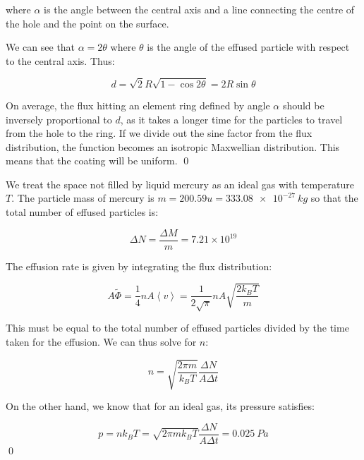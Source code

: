 \documentclass[12pt]{article}
\begin{document}
where $\alpha$ is the angle between the central axis and a line connecting the centre of the hole and the point on the surface.

We can see that $\alpha = 2\theta$ where $\theta$ is the angle of the effused particle with respect to the central axis. Thus:

\begin{equation}
    d = \sqrt{2}R \sqrt{1 - \cos{2\theta}} = 2R \sin{\theta}
\end{equation}

On average, the flux hitting an element ring defined by angle $\alpha$ should be inversely proportional to $d$, as it takes a longer time for the particles to travel from the hole to the ring. If we divide out the sine factor from the flux distribution, the function becomes an isotropic Maxwellian distribution. This means that the coating will be uniform.
\qed


We treat the space not filled by liquid mercury as an ideal gas with temperature $T$. The particle mass of mercury is $m = 200.59u = \qty{333.08e-27}{kg}$ so that the total number of effused particles is:

\begin{equation}
    \Delta N = \frac{\Delta M}{m} = 7.21 \times 10^{19}
\end{equation}

The effusion rate is given by integrating the flux distribution:

\begin{equation}
    A\tilde{\Phi} = \frac{1}{4} nA \left\langle v \right\rangle = \frac{1}{2\sqrt{\pi}} nA \sqrt{\frac{2k_{B}T}{m}}
\end{equation}

This must be equal to the total number of effused particles divided by the time taken for the effusion. We can thus solve for $n$:

\begin{equation}
    n = \sqrt{\frac{2\pi m}{k_{B}T}} \frac{\Delta N}{A \Delta t}
\end{equation}

On the other hand, we know that for an ideal gas, its pressure satisfies:

\begin{equation}
    p = nk_{B}T = \sqrt{2\pi m k_{B} T} \frac{\Delta N}{A \Delta t} = \qty{0.025}{Pa}
\end{equation}
\qed


\end{document}

